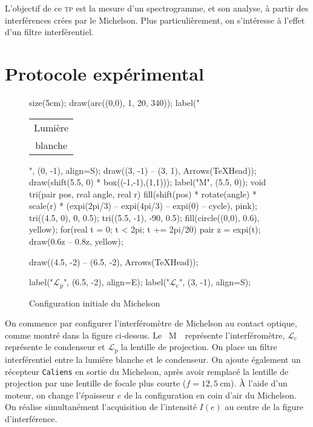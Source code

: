 \documentclass[a4paper,twocolumn,10pt,margin=0.5in]{extreport}
\begin{document}
	L'objectif de ce \textsc{tp} est la mesure d'un spectrogramme, et son analyse, à partir des interférences crées par le Michelson. Plus particulièrement, on s'intéresse à l'effet d'un filtre interférentiel.
	
	\section{Protocole expérimental}

	\begin{figure}[H]
		\centering
		\begin{asy}
			size(5cm);
			draw(arc((0,0), 1, 20, 340));
			label("\begin{tabular}{c}Lumière\\blanche\end{tabular}", (0, -1), align=S);
			draw((3, -1) -- (3, 1), Arrows(TeXHead));
			draw(shift(5.5, 0) * box((-1,-1),(1,1)));
			label("M", (5.5, 0));
			void tri(pair pos, real angle, real r) {
				fill(shift(pos) * rotate(angle) * scale(r) * (expi(2pi/3) -- expi(4pi/3) -- expi(0) -- cycle), pink);
			}
			tri((4.5, 0), 0, 0.5);
			tri((5.5, -1), -90, 0.5);
			fill(circle((0,0), 0.6), yellow);
			for(real t = 0; t < 2pi; t += 2pi/20) {
				pair z = expi(t);
				draw(0.6z -- 0.8z, yellow);
			}

			draw((4.5, -2) -- (6.5, -2), Arrows(TeXHead));

			label("$\mathcal L_{\mathrm p}$", (6.5, -2), align=E);
			label("$\mathcal L_{\mathrm c}$", (3, -1), align=S);
		\end{asy}
		\caption{Configuration initiale du Michelson}
	\end{figure}

	On commence par configurer l'interféromètre de Michelson au contact optique, comme montré dans la figure ci-dessus.
	Le \guillemotleft~M~\guillemotright\ représente l'interféromètre, $\mathcal{L}_\mathrm{c}$ représente le condenseur et $\mathcal{L}_\mathrm{p}$ la lentille de projection.
	On place un filtre interférentiel entre la lumière blanche et le condenseur.
	On ajoute également un récepteur \texttt{Caliens} en sortie du Michelson, après avoir remplacé la lentille de projection par une lentille de focale plus courte ($f = 12{,}5\:\mathrm{cm}$).
	À l'aide d'un moteur, on change l'épaisseur $e$ de la configuration en coin d'air du Michelson. On réalise simultanément l'acquisition de l'intensité $I(e)$ au centre de la figure d'interférence.
\end{document}
